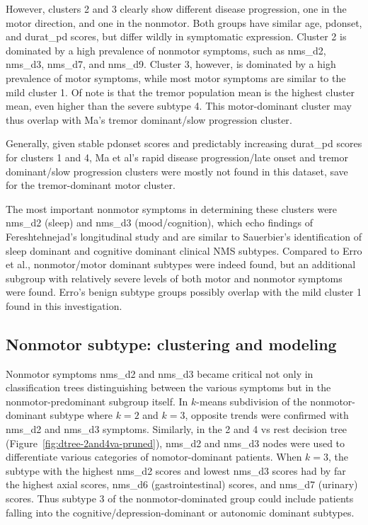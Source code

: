 \documentclass[preprint,3p,twocolumn]{elsarticle} %
\begin{document}
However, clusters 2 and 3 clearly show different disease progression, one in
the motor direction, and one in the nonmotor. Both groups have similar age,
pdonset, and durat\_pd scores, but differ wildly in symptomatic expression.
Cluster 2 is dominated by a high prevalence of nonmotor symptoms, such as
nms\_d2, nms\_d3, nms\_d7, and nms\_d9. Cluster 3, however, is dominated by a
high prevalence of motor symptoms, while most motor symptoms are similar to the
mild cluster 1. Of note is that the tremor population mean
is the highest cluster mean, even higher than the severe subtype 4. This
motor-dominant cluster may thus overlap with Ma's tremor dominant/slow
progression cluster\cite{ma15}.

Generally, given stable pdonset scores and predictably increasing durat\_pd
scores for clusters 1 and 4, Ma et al's rapid disease
progression/late onset and tremor dominant/slow progression clusters
\cite{ma15} were mostly not found in this dataset, save for the tremor-dominant
motor cluster.

The most important nonmotor symptoms in determining these clusters were nms\_d2
(sleep) and nms\_d3 (mood/cognition), which echo findings of Fereshtehnejad's
longitudinal study\cite{fereshtehnejad15} and are similar to Sauerbier's
identification of sleep dominant and cognitive dominant clinical NMS subtypes\cite{sauerbier15}.
Compared to Erro et al.\cite{erro13}, nonmotor/motor
dominant subtypes were indeed found, but an additional subgroup with relatively
severe levels of both motor and nonmotor symptoms were found. Erro's benign
subtype groups possibly overlap with the mild cluster 1 found in this
investigation.

\subsection{Nonmotor subtype: clustering and modeling}
Nonmotor symptoms nms\_d2 and nms\_d3 became critical not only in
classification trees distinguishing between the various symptoms but in the
nonmotor-predominant subgroup itself. In $k$-means subdivision of the
nonmotor-dominant subtype where $k = 2$ and $k = 3$, opposite trends were
confirmed with nms\_d2 and nms\_d3 symptoms. Similarly, in the 2 and 4 vs rest
decision tree (Figure~\ref{fig:dtree-2and4va-pruned}), nms\_d2 and nms\_d3 nodes were
used to differentiate various categories of nomotor-dominant patients.
When $k = 3$, the subtype with the highest nms\_d2 scores and lowest
nms\_d3 scores had by far the highest axial scores, nms\_d6 (gastrointestinal)
scores, and nms\_d7 (urinary) scores. Thus subtype 3 of the nonmotor-dominated
group could include patients falling into the cognitive/depression-dominant or
autonomic dominant subtypes.
\end{document}
